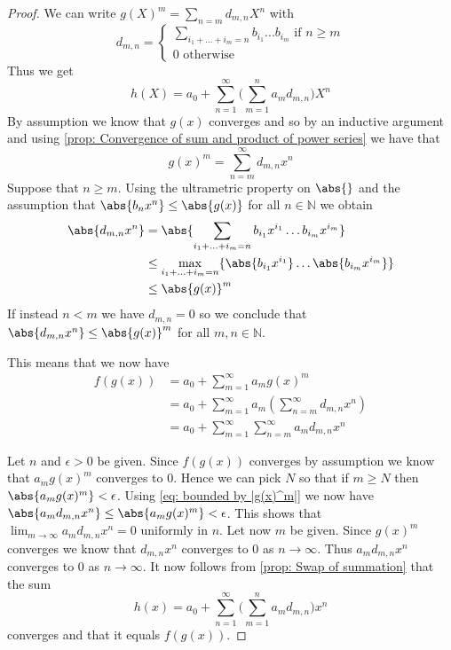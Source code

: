 \documentclass{article}
\newcommand{\mbb}[1]{\mathbb{#1}}
\numberwithin{equation}{section}
\begin{document}
\begin{proof}
    We can write $g(X)^m = \sum_{n = m}d_{m,n} X^n$ with
    $$d_{m,n} = \begin{cases}
            \sum_{i_1 + ... + i_m = n}b_{i_1}...b_{i_m} \text{ if } n \geq m \\
            0 \text{ otherwise}
        \end{cases}$$
    Thus we get
    $$h(X) = a_0 + \sum_{n = 1}^\infty\bigl(\sum_{m=1}^n a_m d_{m,n}  \bigr)X^n$$
    By assumption we know that $g(x)$ converges and so by an inductive argument and using \cref{prop: Convergence of sum and product of power series} we have that
    $$g(x)^m = \sum_{n = m}^\infty d_{m,n}x^n$$
    Suppose that $n \geq m$. Using the ultrametric property on $\abs{}$ and the assumption that $\abs{b_nx^n} \leq \abs{g(x)}$ for all $n \in \mbb N$ we obtain
    \begin{equation}
        \begin{aligned}
            \abs{d_{m,n} x^n} & = \abs{\sum_{i_1 + \ldots + i_m = n} b_{i_1} x^{i_1} \ldots b_{i_m} x^{i_m}}              \\
                              & \leq \max_{i_1 + \ldots + i_m = n} \{\abs{b_{i_1} x^{i_1}} \ldots \abs{b_{i_m} x^{i_m}}\} \\
                              & \leq \abs{g(x)}^m
        \end{aligned}
        \label{eq: bounded by |g(x)^m|}
    \end{equation}
    If instead $n < m$ we have $d_{m,n} = 0$ so we conclude that $\abs{d_{m,n} x^n} \leq \abs {g(x)}^m$ for all $m,n \in \mbb N$.

    This means that we now have
    \begin{align*}
        f(g(x)) & = a_0 + \sum_{m = 1}^\infty a_m g(x)^m                            \\
                & = a_0 + \sum_{m = 1}^\infty a_m (\sum_{n = m}^\infty d_{m,n} x^n) \\
                & = a_0 + \sum_{m = 1}^\infty \sum_{n = m}^\infty a_m d_{m,n} x^n
    \end{align*}

    Let $n$ and $\epsilon > 0$ be given. Since $f(g(x))$ converges by assumption we know that $a_m g(x)^m$ converges to 0. Hence we can pick $N$ so that if $m \geq N$ then $\abs{a_m g(x)^m} < \epsilon$. Using \cref{eq: bounded by |g(x)^m|} we now have
    $\abs{a_m d_{m,n}x^n} \leq \abs{a_m g(x)^m} < \epsilon$. This shows that $\lim_{m \to \infty} a_m d_{m,n}x^n = 0 \text{ uniformly in } n$. Let now $m$ be given. Since $g(x)^m$ converges we know that $d_{m,n}x^n$ converges to 0 as $n \to \infty$. Thus $a_m d_{m,n}x^n$ converges to 0 as $n \to \infty$. It now follows from \cref{prop: Swap of summation} that the sum
    $$h(x) = a_0 + \sum_{n = 1}^\infty\bigl(\sum_{m=1}^n a_m d_{m,n}  \bigr)x^n$$
    converges and that it equals $f(g(x))$.
\end{proof}
\end{document}
